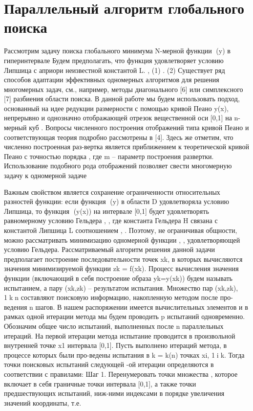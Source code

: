 \section{Параллельный алгоритм глобального поиска}
Рассмотрим задачу поиска глобального минимума N-мерной функции (y) в гиперинтервале   Будем предполагать, что функция удовлетворяет условию Липшица с априори неизвестной константой L.
	 ,					(1)
	 .			(2)
Существует ряд способов адаптации эффективных одномерных алгоритмов для решения многомерных задач, см., например, методы диагонального [6] или симплексного [7] разбиения области поиска. В данной работе мы будем использовать подход, основанный на идее редукции размерности с помощью кривой Пеано y(x), непрерывно и однозначно отображающей отрезок вещественной оси [0,1] на n-мерный куб 
 .
Вопросы численного построения отображений типа кривой Пеано и соответствующая теория подробно рассмотрены в [4]. Здесь же отметим, что численно построенная раз-вертка является приближением к теоретической кривой Пеано с точностью порядка , где m – параметр построения развертки. Использование подобного рода отображений позволяет свести многомерную задачу к одномерной задаче 
 
Важным свойством является сохранение ограниченности относительных разностей функции: если функция (y) в области D удовлетворяла условию Липшица, то функция (y(x)) на интервале [0,1] будет удовлетворять равномерному условию Гельдера 
 ,  ,
где константа Гельдера H связана с константой Липшица L соотношением 
 ,  .
Поэтому, не ограничивая общности, можно рассматривать минимизацию одномерной функции  ,  , удовлетворяющей условию Гельдера.
Рассматриваемый алгоритм решения данной задачи предполагает построение последовательности точек xk, в которых вычисляются значения минимизируемой функции zk = f(xk). Процесс вычисления значения функции (включающий в себя построение образа yk=y(xk)) будем называть испытанием, а пару (xk,zk) – результатом испытания. Множество пар {(xk,zk)}, 1kn составляют поисковую информацию, накопленную методом после про-ведения n шагов. В нашем распоряжении имеется   вычислительных элементов и в рамках одной итерации метода мы будем проводить p испытаний одновременно. Обозначим   общее число испытаний, выполненных после n параллельных итераций.
На первой итерации метода испытание проводится в произвольной внутренней точке x1 интервала [0,1]. Пусть выполнено   итераций метода, в процессе которых были про-ведены испытания в  k = k(n) точках xi, 1ik. Тогда точки   поисковых испытаний следующей  -ой итерации определяются в соответствии с правилами:
Шаг 1. Перенумеровать точки множества  , которое включает в себя граничные точки интервала [0,1], а также точки предшествующих испытаний, ниж-ними индексами в порядке увеличения значений координаты, т.е. 
 
